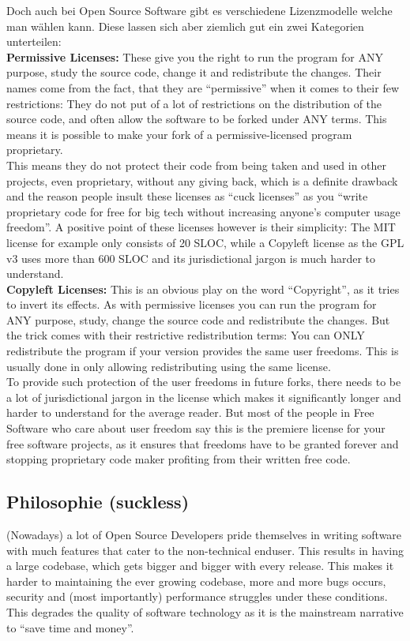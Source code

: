 \documentclass[a4paper,11pt]{article}
\begin{document}
Doch auch bei Open Source Software gibt es verschiedene Lizenzmodelle welche man wählen kann. Diese lassen sich aber ziemlich gut ein zwei Kategorien unterteilen:\\

\textbf{Permissive Licenses:}
These give you the right to run the program for ANY purpose, study the source code, change it and redistribute the changes. Their names come from the fact, that they are ``permissive'' when it comes to their few restrictions: They do not put of a lot of restrictions on the distribution of the source code, and often allow the software to be forked under ANY terms. This means it is possible to make your fork of a permissive-licensed program proprietary.\\

This means they do not protect their code from being taken and used in other projects, even proprietary, without any giving back, which is a definite drawback and the reason people insult these licenses as ``cuck licenses'' as you ``write proprietary code for free for big tech without increasing anyone's computer usage freedom''. A positive point of these licenses however is their simplicity: The MIT license for example only consists of 20 SLOC, while a Copyleft license as the GPL v3 uses more than 600 SLOC and its jurisdictional jargon is much harder to understand.\\

\textbf{Copyleft Licenses:}
This is an obvious play on the word ``Copyright'', as it tries to invert its effects. As with permissive licenses you can run the program for ANY purpose, study, change the source code and redistribute the changes. But the trick comes with their restrictive redistribution terms: You can ONLY redistribute the program if your version provides the same user freedoms. This is usually done in only allowing redistributing using the same license.\\

To provide such protection of the user freedoms in future forks, there needs to be a lot of jurisdictional jargon in the license which makes it significantly longer and harder to understand for the average reader. But most of the people in Free Software who care about user freedom say this is the premiere license for your free software projects, as it ensures that freedoms have to be granted forever and stopping proprietary code maker profiting from their written free code.\\

\subsection{Philosophie (suckless)}
(Nowadays) a lot of Open Source Developers pride themselves in writing software with much features that cater to the non-technical enduser. This results in having a large codebase, which gets bigger and bigger with every release. This makes it harder to maintaining the ever growing codebase, more and more bugs occurs, security and (most importantly) performance struggles under these conditions. This degrades the quality of software technology as it is the mainstream narrative to ``save time and money''.\\
\end{document}
